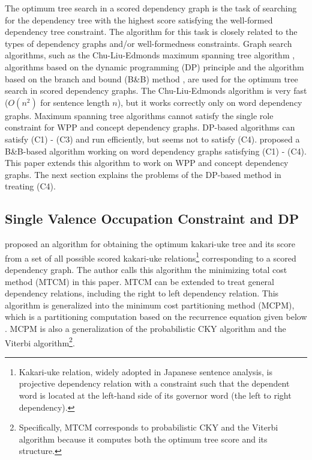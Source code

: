 The optimum tree search in a scored dependency graph is the task of
searching for the dependency tree with the highest score satisfying the
well-formed dependency tree constraint. The algorithm for this task is
closely related to the types of dependency graphs and/or
well-formedness constraints. Graph search algorithms, such as the
Chu-Liu-Edmonds maximum spanning tree algorithm
\cite{ChuLiu65,Edmonds67}, algorithms based on the dynamic
programming (DP) principle \cite{Ozeki94,Eisner96} and the algorithm based
on the branch and bound (B\&B) method \cite{Hirakawa01}, are used for
the optimum tree search in scored dependency graphs. The Chu-Liu-Edmonds
algorithm is very fast ($O(n^2)$ for sentence length $n$), but it works
correctly only on word dependency graphs. Maximum spanning tree
algorithms cannot satisfy the single role constraint for WPP and
concept dependency graphs. DP-based algorithms can satisfy (C1) - (C3)
and run efficiently, but seems not to satisfy (C4). \cite{Hirakawa01} proposed a
B\&B-based algorithm working on word dependency graphs satisfying (C1)
- (C4). This paper extends this algorithm to work on
WPP and concept dependency graphs. The next section explains the
problems of the DP-based method in treating (C4).

\subsection{Single Valence Occupation Constraint and DP}


 \cite{Ozeki94} proposed an algorithm for obtaining the optimum
kakari-uke tree and its score from a set of all possible scored
kakari-uke relations\footnote{Kakari-uke relation, widely adopted in
Japanese sentence analysis, is projective dependency relation with a
constraint such that the dependent word is located at the left-hand
side of its governor word (the left to right dependency).}
corresponding to a scored dependency graph. The author calls this
algorithm the minimizing total cost method (MTCM) in this paper. MTCM
can be extended to treat general dependency relations, including the
right to left dependency relation\cite{Kato_ehara89}. This algorithm
is generalized into the minimum cost partitioning method (MCPM), which
is a partitioning computation based on the recurrence equation given
below \cite{Ozeki99_e}. MCPM is also a generalization of the
probabilistic CKY algorithm and the Viterbi algorithm\footnote{Specifically, MTCM corresponds to probabilistic CKY and the
Viterbi algorithm because it computes both the optimum tree score and
its structure.}.


